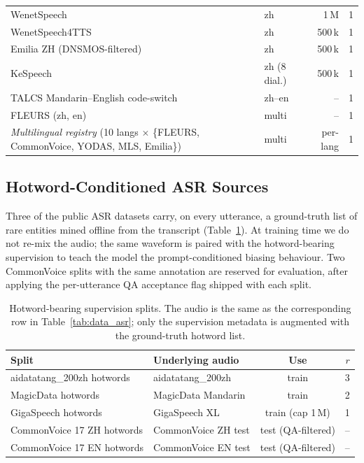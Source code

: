 \begin{table}[t]
\begin{tabular}{p{7.8cm}lrr}
    WenetSpeech \cite{zhang2022wenetspeech}                                         & zh       & 1\,M & 1 \\
    WenetSpeech4TTS                                                                 & zh       & 500\,k & 1 \\
    Emilia ZH (DNSMOS-filtered) \cite{he2024emilia, reddy2021dnsmos}                & zh       & 500\,k & 1 \\
    KeSpeech \cite{tang2021kespeech}                                                & zh (8 dial.) & 500\,k & 1 \\
    TALCS Mandarin--English code-switch \cite{li2022talcs}                          & zh--en   & --   & 1 \\
    FLEURS (zh, en)                                                                 & multi    & --   & 1 \\
    \emph{Multilingual registry} (10 langs $\times$ \{FLEURS, CommonVoice, YODAS, MLS, Emilia\}) & multi    & per-lang & 1 \\
    \bottomrule
  \end{tabular}
\end{table}

\subsection{Hotword-Conditioned ASR Sources}
\label{subsec:hotword-sources}

Three of the public ASR datasets carry, on every utterance, a
ground-truth list of rare entities mined offline from the transcript
(Table~\ref{tab:data_hotwords}). At training time we do not re-mix
the audio; the same waveform is paired with the hotword-bearing
supervision to teach the model the prompt-conditioned biasing
behaviour. Two CommonVoice splits with the same annotation are
reserved for evaluation, after applying the per-utterance QA
acceptance flag shipped with each split.

\begin{table}[t]
  \caption{Hotword-bearing supervision splits. The audio is the same
    as the corresponding row in Table~\ref{tab:data_asr}; only the
    supervision metadata is augmented with the ground-truth hotword
    list.}
  \label{tab:data_hotwords}
  \centering
  \small
  \begin{tabular}{llcr}
    \toprule
    Split & Underlying audio & Use & $r$ \\
    \midrule
    aidatatang\_200zh hotwords & aidatatang\_200zh   & train              & 3 \\
    MagicData hotwords         & MagicData Mandarin  & train              & 2 \\
    GigaSpeech hotwords        & GigaSpeech XL       & train (cap 1\,M)   & 1 \\
    \midrule
    CommonVoice 17 ZH hotwords & CommonVoice ZH test & test (QA-filtered) & -- \\
    CommonVoice 17 EN hotwords & CommonVoice EN test & test (QA-filtered) & -- \\
    \bottomrule
  \end{tabular}
\end{table}

